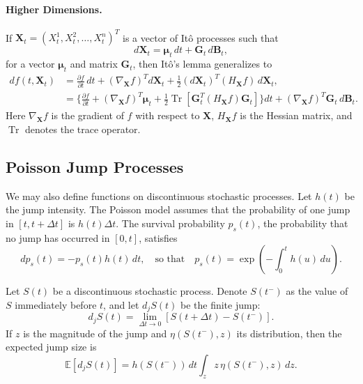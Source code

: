 \documentclass[10pt,twocolumn]{article}
\begin{document}
\paragraph{Higher Dimensions.}
If $\mathbf{X}_t = (X_t^{1}, X_t^{2}, \ldots, X_t^{n})^{T}$ is a vector of It\^o processes such that
\begin{equation}
d\mathbf{X}_t = \boldsymbol{\mu}_t\,dt + \mathbf{G}_t\,d\mathbf{B}_t,
\end{equation}
for a vector $\boldsymbol{\mu}_t$ and matrix $\mathbf{G}_t$, then It\^o's lemma generalizes to
\begin{align}
df(t, \mathbf{X}_t)
&= \frac{\partial f}{\partial t}\,dt
+ (\nabla_{\mathbf{X}} f)^{T} d\mathbf{X}_t
+ \frac{1}{2} (d\mathbf{X}_t)^{T} (H_{\mathbf{X}} f)\, d\mathbf{X}_t, \\
&= \Bigg\{
\frac{\partial f}{\partial t}
+ (\nabla_{\mathbf{X}} f)^{T} \boldsymbol{\mu}_t
+ \frac{1}{2} \operatorname{Tr}\!\left[
\mathbf{G}_t^{T} (H_{\mathbf{X}} f) \mathbf{G}_t
\right]
\Bigg\} dt
+ (\nabla_{\mathbf{X}} f)^{T} \mathbf{G}_t\, d\mathbf{B}_t.
\end{align}
Here $\nabla_{\mathbf{X}} f$ is the gradient of $f$ with respect to $\mathbf{X}$, 
$H_{\mathbf{X}} f$ is the Hessian matrix, and $\operatorname{Tr}$ denotes the trace operator.

\subsection*{Poisson Jump Processes}

We may also define functions on discontinuous stochastic processes.
Let $h(t)$ be the jump intensity.  
The Poisson model assumes that the probability of one jump in $[t, t+\Delta t]$ is $h(t)\Delta t$.
The survival probability $p_s(t)$, the probability that no jump has occurred in $[0, t]$, satisfies
\begin{equation}
dp_s(t) = -p_s(t) h(t)\,dt,
\quad \text{so that} \quad
p_s(t) = \exp\!\left(-\int_0^t h(u)\,du\right).
\end{equation}

Let $S(t)$ be a discontinuous stochastic process. 
Denote $S(t^-)$ as the value of $S$ immediately before $t$, and let $d_j S(t)$ be the finite jump:
\begin{equation}
d_j S(t) = \lim_{\Delta t \to 0} [S(t + \Delta t) - S(t^-)].
\end{equation}
If $z$ is the magnitude of the jump and $\eta(S(t^-), z)$ its distribution, then the expected jump size is
\begin{equation}
\mathbb{E}[d_j S(t)] = h(S(t^-))\,dt \int_z z\,\eta(S(t^-), z)\,dz.
\end{equation}
\end{document}
